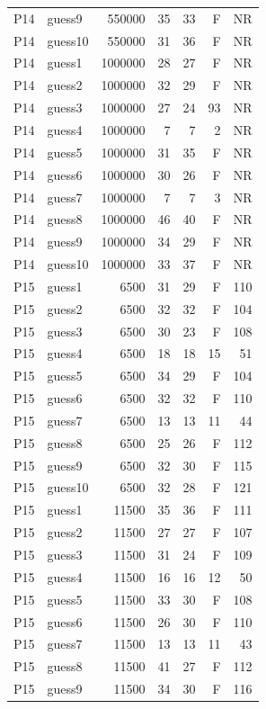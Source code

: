 {\begin{longtable}{llrrrrr}
P14 & guess9 & 550000 & 35 & 33 & F & NR \\
P14 & guess10 & 550000 & 31 & 36 & F & NR \\
P14 & guess1 & 1000000 & 28 & 27 & F & NR \\
P14 & guess2 & 1000000 & 32 & 29 & F & NR \\
P14 & guess3 & 1000000 & 27 & 24 & 93 & NR \\
P14 & guess4 & 1000000 & 7 & 7 & 2 & NR \\
P14 & guess5 & 1000000 & 31 & 35 & F & NR \\
P14 & guess6 & 1000000 & 30 & 26 & F & NR \\
P14 & guess7 & 1000000 & 7 & 7 & 3 & NR \\
P14 & guess8 & 1000000 & 46 & 40 & F & NR \\
P14 & guess9 & 1000000 & 34 & 29 & F & NR \\
P14 & guess10 & 1000000 & 33 & 37 & F & NR \\
P15 & guess1 & 6500 & 31 & 29 & F & 110 \\
P15 & guess2 & 6500 & 32 & 32 & F & 104 \\
P15 & guess3 & 6500 & 30 & 23 & F & 108 \\
P15 & guess4 & 6500 & 18 & 18 & 15 & 51 \\
P15 & guess5 & 6500 & 34 & 29 & F & 104 \\
P15 & guess6 & 6500 & 32 & 32 & F & 110 \\
P15 & guess7 & 6500 & 13 & 13 & 11 & 44 \\
P15 & guess8 & 6500 & 25 & 26 & F & 112 \\
P15 & guess9 & 6500 & 32 & 30 & F & 115 \\
P15 & guess10 & 6500 & 32 & 28 & F & 121 \\
P15 & guess1 & 11500 & 35 & 36 & F & 111 \\
P15 & guess2 & 11500 & 27 & 27 & F & 107 \\
P15 & guess3 & 11500 & 31 & 24 & F & 109 \\
P15 & guess4 & 11500 & 16 & 16 & 12 & 50 \\
P15 & guess5 & 11500 & 33 & 30 & F & 108 \\
P15 & guess6 & 11500 & 26 & 30 & F & 110 \\
P15 & guess7 & 11500 & 13 & 13 & 11 & 43 \\
P15 & guess8 & 11500 & 41 & 27 & F & 112 \\
P15 & guess9 & 11500 & 34 & 30 & F & 116 \\

\end{longtable}}
